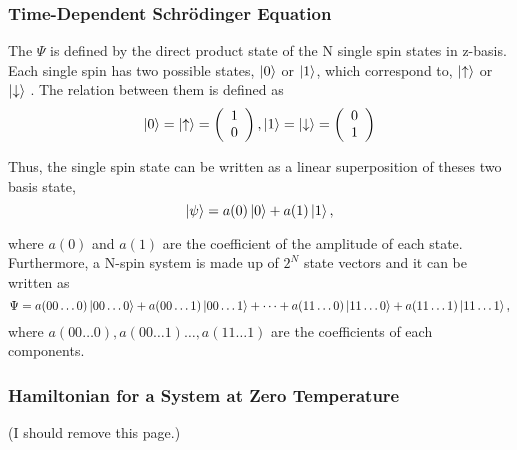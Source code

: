 \documentclass{beamer}
\begin{document}
\begin{frame}
	\frametitle{Time-Dependent Schrödinger Equation}
	The $\Psi$ is defined by the direct product state of the N single spin states in z-basis. Each single spin has two possible states, $\ket{0}$ or $\ket{1}$, which correspond to, $\ket{\uparrow}$ or $\ket{\downarrow}$ . The relation between them is defined as 	
	\begin{equation*}
	\ket{0}=\ket{\uparrow}=\left(\begin{array}{c} 1\\0 \end{array}\right), \ket{1}=\ket{\downarrow}=\left(\begin{array}{c} 0\\1 \end{array}\right)
	\end{equation*}
	
	Thus, the single spin state can be written as a linear superposition of theses two basis state, 	
	\begin{equation*}
	\ket{\psi} = a(0)\ket{0} + a(1)\ket{1},
	\end{equation*}
	
	where $a(0)$ and $a(1)$ are the coefficient of the amplitude of each state. Furthermore, a N-spin system is made up of $2^N$ state vectors and it can be written as 	
	\begin{equation*}
	\label{psi_in_compuationalbasis}
	\Psi = a(00\dots0)\ket{00\dots0}+a(00\dots1)\ket{00\dots1}+\dots+a(11\dots0)\ket{11\dots0}+a(11\dots1)\ket{11\dots1},
	\end{equation*}
	where $a(00\dots0), a(00\dots1)\dots, a(11\dots1)$ are the coefficients of each components. 
\end{frame}



\begin{frame}
	\frametitle{Hamiltonian for a System at Zero Temperature}
	(I should remove this page.)
\end{frame}
\end{document}
